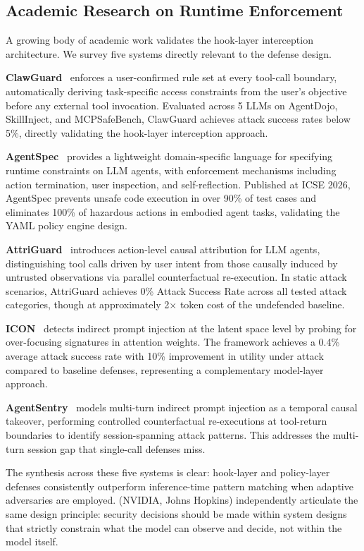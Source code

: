 \documentclass[11pt,letterpaper]{article}
\begin{document}
\subsection{Academic Research on Runtime Enforcement}

A growing body of academic work validates the hook-layer interception architecture.
We survey five systems directly relevant to the defense design.

\textbf{ClawGuard}~\citep{zhao2026clawguard} enforces a user-confirmed rule set at every
tool-call boundary, automatically deriving task-specific access constraints from the
user's objective before any external tool invocation. Evaluated across 5 LLMs on
AgentDojo, SkillInject, and MCPSafeBench, ClawGuard achieves attack success rates below
5\%, directly validating the hook-layer interception approach.

\textbf{AgentSpec}~\citep{wang2026agentspec} provides a lightweight domain-specific
language for specifying runtime constraints on LLM agents, with enforcement mechanisms
including action termination, user inspection, and self-reflection. Published at ICSE
2026, AgentSpec prevents unsafe code execution in over 90\% of test cases and eliminates
100\% of hazardous actions in embodied agent tasks, validating the YAML policy engine
design.

\textbf{AttriGuard}~\citep{he2026attriguard} introduces action-level causal attribution
for LLM agents, distinguishing tool calls driven by user intent from those causally
induced by untrusted observations via parallel counterfactual re-execution. In static
attack scenarios, AttriGuard achieves 0\% Attack Success Rate across all tested attack
categories, though at approximately 2$\times$ token cost of the undefended baseline.

\textbf{ICON}~\citep{wang2026icon} detects indirect prompt injection at the latent
space level by probing for over-focusing signatures in attention weights. The framework
achieves a 0.4\% average attack success rate with 10\% improvement in utility under
attack compared to baseline defenses, representing a complementary model-layer approach.

\textbf{AgentSentry}~\citep{authors2026agentsentry} models multi-turn indirect prompt injection
as a temporal causal takeover, performing controlled counterfactual re-executions at
tool-return boundaries to identify session-spanning attack patterns. This addresses
the multi-turn session gap that single-call defenses miss.

The synthesis across these five systems is clear: hook-layer and policy-layer defenses
consistently outperform inference-time pattern matching when adaptive adversaries are
employed. \citet{research2026architecting} (NVIDIA, Johns Hopkins) independently
articulate the same design principle: security decisions should be made within system
designs that strictly constrain what the model can observe and decide, not within the
model itself.
\end{document}
